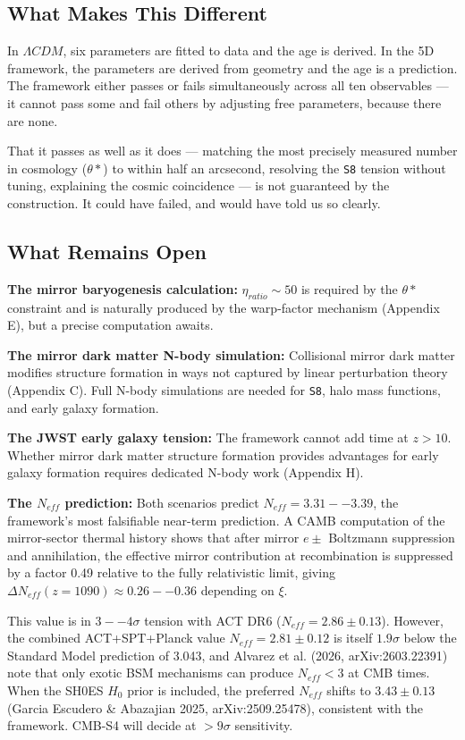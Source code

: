 \documentclass[aps,prd,preprint,superscriptaddress,longbibliography]{revtex4-2}
\begin{document}
\subsection{What Makes This Different}

In $\Lambda CDM$, six parameters are fitted to data and the age is derived. In the 5D framework, the parameters are derived from geometry and the age is a prediction. The framework either passes or fails simultaneously across all ten observables --- it cannot pass some and fail others by adjusting free parameters, because there are none.

That it passes as well as it does --- matching the most precisely measured number in cosmology ($\theta*$) to within half an arcsecond, resolving the \texttt{S8} tension without tuning, explaining the cosmic coincidence --- is not guaranteed by the construction. It could have failed, and would have told us so clearly.


\subsection{What Remains Open}

\textbf{The mirror baryogenesis calculation:} $\eta_{ratio} \sim  50$ is required by the $\theta*$ constraint and is naturally produced by the warp-factor mechanism (Appendix E), but a precise computation awaits.

\textbf{The mirror dark matter N-body simulation:} Collisional mirror dark matter modifies structure formation in ways not captured by linear perturbation theory (Appendix C). Full N-body simulations are needed for \texttt{S8}, halo mass functions, and early galaxy formation.

\textbf{The JWST early galaxy tension:} The framework cannot add time at $z > 10$. Whether mirror dark matter structure formation provides advantages for early galaxy formation requires dedicated N-body work (Appendix H).

\textbf{The $N_{eff}$ prediction:} Both scenarios predict $N_{eff} = 3.31--3.39$, the framework's most falsifiable near-term prediction. A CAMB computation of the mirror-sector thermal history shows that after mirror $e\pm$ Boltzmann suppression and annihilation, the effective mirror contribution at recombination is suppressed by a factor 0.49 relative to the fully relativistic limit, giving $\Delta N_{eff}(z = 1090) \approx 0.26--0.36$ depending on $\xi$.

This value is in $3--4\sigma$ tension with ACT DR6 ($N_{eff} = 2.86 \pm 0.13$). However, the combined ACT+SPT+Planck value $N_{eff} = 2.81 \pm 0.12$ is itself $1.9\sigma$ below the Standard Model prediction of 3.043, and Alvarez et al. (2026, arXiv:2603.22391) note that only exotic BSM mechanisms can produce $N_{eff} < 3$ at CMB times. When the SH0ES $H_{0}$ prior is included, the preferred $N_{eff}$ shifts to $3.43 \pm 0.13$ (Garcia Escudero \& Abazajian 2025, arXiv:2509.25478), consistent with the framework. CMB-S4 will decide at $> 9\sigma$ sensitivity.
\end{document}
